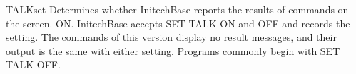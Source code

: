 \begin{XbaseEntry}{TALK}{set}
Determines whether InitechBase reports the results of commands on the screen.
\Syntax
{}
\Defaults
ON.
\Usage
InitechBase accepts SET TALK ON and OFF and records the setting.  The commands
of this version display no result messages, and their output is the same with
either setting.  Programs commonly begin with SET TALK OFF.
\end{XbaseEntry}

